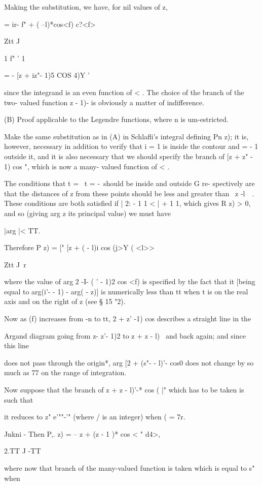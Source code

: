 {{Making the substitution, we have, for nil values of z,

= ir- f" + ( --l)*cos<f) c?<f>

Ztt J \

1 f" ' 1

= - [z + iz"- 1)5 COS 4)Y '

since the integrand is an even function of < . The choice of the
branch of the two- valued function z - 1)- is obviously a matter of
indifference.

(B) Proof applicable to the Legendre functions, where n is
um-estricted.

Make the same substitution as in (A) in Schlafli's integral defining
Pn z); it is, however, necessary in addition to verify that i = 1 is
inside the contour and = - 1 outside it, and it is also necessary that
we should specify the branch of [z + z" - 1) cos ", which is now a
many- valued function of < .

The conditions that t = \, t = -\ should be inside and outside G re-
spectively are that the distances of z from these points should be
less and greater than \ z -l\ \ . These conditions are both satisfied
if | 2: - 1 1 < | + 1 1, which gives R z) > 0, and so (giving arg z
its principal value) we must have

|arg |< TT.

Therefore P z) = [" [z + ( - l)i cos (j>Y ( <l>>

Ztt J \,r

where the value of arg 2 -I- ( ' - 1)2 cos <f) is specified by the
fact that it [being equal to arg(i'- - 1) - arg( - z)] is numerically
less than tt when t is on the real axis and on the right of z (see §
15 "2).

Now as (f) increases from -n to tt, 2 + z' -1) cos describes a
straight line in the

Argand diagram going from z- z'- 1)2 to z + z - l)~ and back again;
and since this line

does not pass through the origin*, arg [2 + (s"- - l)'- cos0 does not
change by so much as 77 on the range of integration.

Now suppose that the branch of z + z - l)'-* cos ( |" which has to be
taken is such that

it reduces to z" e'""-'" (where / is an integer) when ( = 7r.

Jnkni - Then P,. z) = -- z + (z - 1 )* cos < " d4>,

2.TT J -TT

where now that branch of the many-valued function is taken which is
equal to s" when

}}
